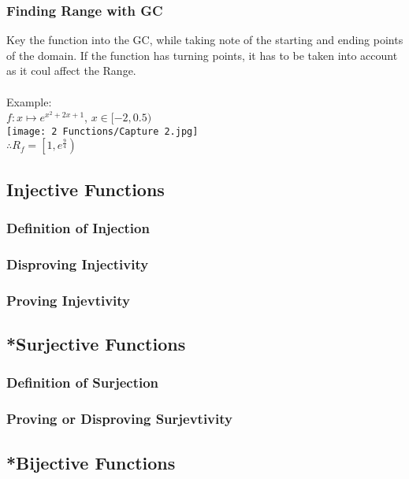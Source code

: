 \documentclass[../main.tex]{subfiles}
\begin{document}
\subsubsection{Finding Range with GC}
Key the function into the GC, while taking note of the starting and ending points of the domain.
If the function has turning points, it has to be taken into account as it coul affect the Range. \\\\
Example: \\
\(\displaystyle f:x \mapsto e^{x^{2}+2x+1}\), \(x \in [-2,0.5)\) \\
\texttt{[image: 2 Functions/Capture 2.jpg]} \\
\(\therefore R_{f} = \left[1,e^{\textstyle \frac{9}{4}}\right)\)

\subsection{Injective Functions}

\subsubsection{Definition of Injection}

\subsubsection{Disproving Injectivity}

\subsubsection{Proving Injevtivity}

\subsection{*Surjective Functions}

\subsubsection{Definition of Surjection}

\subsubsection{Proving or Disproving Surjevtivity}

\subsection{*Bijective Functions}
\end{document}

